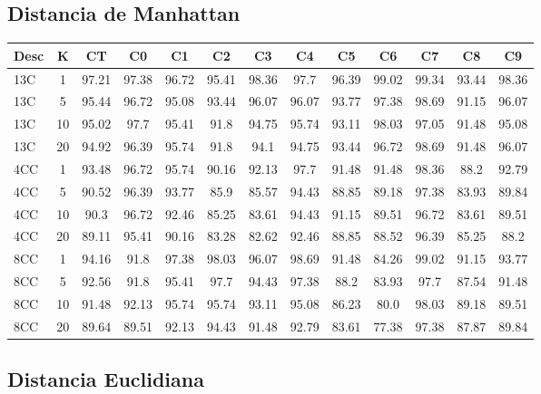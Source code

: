 \begin{appendices}
\subsection{Distancia de Manhattan}
\begin{tabular}{|l|c|c|c|c|c|c|c|c|c|c|c|c|}
\hline
\textbf{Desc}&\textbf{K}&\textbf{CT}&\textbf{C0}&\textbf{C1}&\textbf{C2}&\textbf{C3}&\textbf{C4}&\textbf{C5}&\textbf{C6}&\textbf{C7}&\textbf{C8}&\textbf{C9}\\
\hline
13C&1&97.21&97.38&96.72&95.41&98.36&97.7&96.39&99.02&99.34&93.44&98.36\\
\hline
13C&5&95.44&96.72&95.08&93.44&96.07&96.07&93.77&97.38&98.69&91.15&96.07\\
\hline
13C&10&95.02&97.7&95.41&91.8&94.75&95.74&93.11&98.03&97.05&91.48&95.08\\
\hline
13C&20&94.92&96.39&95.74&91.8&94.1&94.75&93.44&96.72&98.69&91.48&96.07\\
\hline
4CC&1&93.48&96.72&95.74&90.16&92.13&97.7&91.48&91.48&98.36&88.2&92.79\\
\hline
4CC&5&90.52&96.39&93.77&85.9&85.57&94.43&88.85&89.18&97.38&83.93&89.84\\
\hline
4CC&10&90.3&96.72&92.46&85.25&83.61&94.43&91.15&89.51&96.72&83.61&89.51\\
\hline
4CC&20&89.11&95.41&90.16&83.28&82.62&92.46&88.85&88.52&96.39&85.25&88.2\\
\hline
8CC&1&94.16&91.8&97.38&98.03&96.07&98.69&91.48&84.26&99.02&91.15&93.77\\
\hline
8CC&5&92.56&91.8&95.41&97.7&94.43&97.38&88.2&83.93&97.7&87.54&91.48\\
\hline
8CC&10&91.48&92.13&95.74&95.74&93.11&95.08&86.23&80.0&98.03&89.18&89.51\\
\hline
8CC&20&89.64&89.51&92.13&94.43&91.48&92.79&83.61&77.38&97.38&87.87&89.84\\
\hline\end{tabular}

\subsection{Distancia Euclidiana}


\end{appendices}
